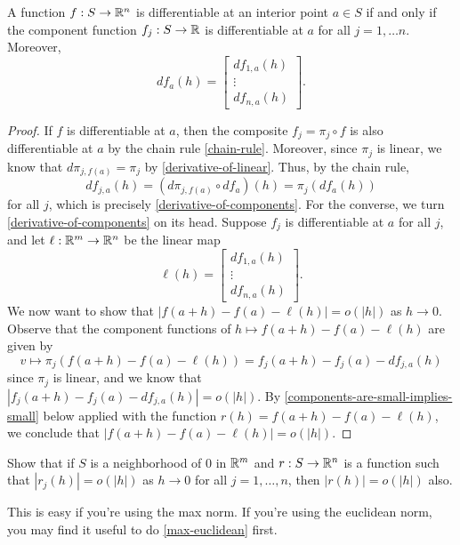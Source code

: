 \begin{proposition} \label{differentiable-by-components}
	A function $f : S \to \mathbb{R}^n$ is differentiable at an interior point $a \in S$ if and only if the component function $f_j : S \to \mathbb{R}$ is differentiable at $a$ for all $j = 1, \dotsc n$. Moreover,
	\begin{equation} \label{derivative-of-components} df_a(h) = \begin{bmatrix} df_{1,a}(h) \\ \vdots \\ df_{n,a}(h) \end{bmatrix}. \end{equation}
\end{proposition}

\begin{proof}
	If $f$ is differentiable at $a$, then the composite $f_j = \pi_j \circ f$ is also differentiable at $a$ by the chain rule \ref{chain-rule}. Moreover, since $\pi_j$ is linear, we know that $d\pi_{j,f(a)} = \pi_j$ by \cref{derivative-of-linear}. Thus, by the chain rule, 
	\[ df_{j,a}(h) = (d\pi_{j,f(a)} \circ df_a)(h) = \pi_j(df_a(h)) \]
	for all $j$, which is precisely \cref{derivative-of-components}. 
	For the converse, we turn \cref{derivative-of-components} on its head. Suppose $f_j$ is differentiable at $a$ for all $j$, and let $\ell : \mathbb{R}^m \to \mathbb{R}^n$ be the linear map 
	\[ \ell(h) = \begin{bmatrix} df_{1,a}(h) \\ \vdots \\ df_{n,a}(h) \end{bmatrix}.  \]
	We now want to show that $|f(a+h)-f(a)-\ell(h)| = o(|h|)$ as $h \to 0$. Observe that the component functions of $h \mapsto f(a+h)-f(a)-\ell(h)$ are given by
	\[ v \mapsto \pi_j \left( f(a+h)-f(a)-\ell(h) \right) = f_j(a+h)-f_j(a)-df_{j,a}(h) \]
	since $\pi_j$ is linear, 
	and we know that $|f_j(a+h)-f_j(a)-df_{j,a}(h)| = o(|h|)$. By \cref{components-are-small-implies-small} below applied with the function $r(h) = f(a+h)-f(a)-\ell(h)$, we conclude that $|f(a+h)-f(a)-\ell(h)| = o(|h|)$. 
\end{proof}

\begin{exercise} \label{components-are-small-implies-small}
	Show that if $S$ is a neighborhood of 0 in $\mathbb{R}^m$ and $r :  S  \to \mathbb{R}^n$ is a function such that $|r_j(h)| = o(|h|)$ as $h \to 0$ for all $j = 1, \dotsc, n$, then $|r(h)| = o(|h|)$ also.
	\begin{hint}
		This is easy if you're using the max norm. If you're using the euclidean norm, you may find it useful to do \cref{max-euclidean} first. 
	\end{hint}
\end{exercise}

